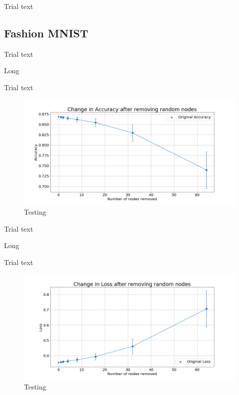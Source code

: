 \documentclass[UKenglish]{ifimaster}
\begin{document}
            Trial text

        \subsection{Fashion MNIST}

            Trial text

            \begin{table}[h!]
                \centering
                \resizebox{\textwidth}{!}{}
                \caption[Short]{Long}
                \label{tab:ac_rnd_rem_fmnist}
            \end{table}

            Trial text

            \begin{figure}[h!]\centering
                \includegraphics[width=\textwidth]{Accuracy_change_random_removal_fmnist.png}
                \caption[Short title]{Testing}
                \label{fig:acc_rn_fmnist}
            \end{figure}

            Trial text

            \begin{table}[h!]
                \centering
                \resizebox{\textwidth}{!}{}
                \caption[Short]{Long}
                \label{tab:loss_rnd_rem_fmnist}
            \end{table}

            Trial text

            \begin{figure}[h!]\centering
                \includegraphics[width=\textwidth]{Loss_change_random_removal_fmnist.png}
                \caption[Short title]{Testing}
                \label{fig:loss_rn_fmnist}
            \end{figure}
\end{document}
